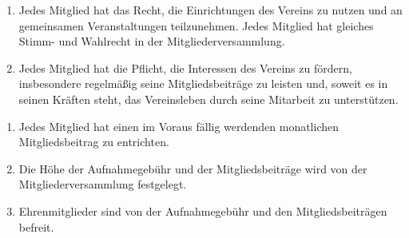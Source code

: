 \documentclass{scrartcl}
\begin{document}
\begin{contract}
\begin{enumerate}
    \item Jedes Mitglied hat das Recht, die Einrichtungen des Vereins zu nutzen und an gemeinsamen Veranstaltungen teilzunehmen.  Jedes Mitglied hat gleiches Stimm- und Wahlrecht in der Mitgliederversammlung.
    \item Jedes Mitglied hat die Pflicht, die Interessen des Vereins zu fördern, insbesondere regelmäßig seine Mitgliedsbeiträge zu leisten und, soweit es in seinen Kräften steht, das Vereinsleben durch seine Mitarbeit zu unterstützen.
\end{enumerate}

\begin{enumerate}
    \item Jedes Mitglied hat einen im Voraus fällig werdenden monatlichen Mitgliedsbeitrag zu entrichten.
    \item Die Höhe der Aufnahmegebühr und der Mitgliedsbeiträge wird von der Mitgliederversammlung festgelegt.
    \item Ehrenmitglieder sind von der Aufnahmegebühr und den Mitgliedsbeiträgen befreit.
\end{enumerate}

\end{contract}
\end{document}
